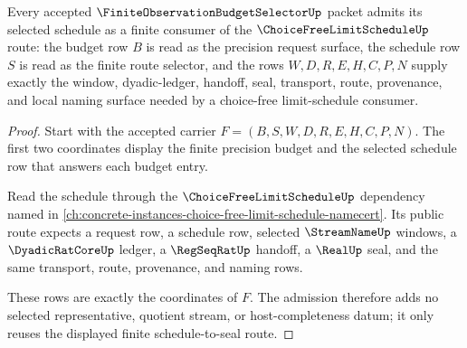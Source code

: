 \begin{theorem}
\label{thm:finite-observation-budget-selector-schedule-admission}
Every accepted $\FiniteObservationBudgetSelectorUp$ packet admits its selected schedule as a finite consumer of the $\ChoiceFreeLimitScheduleUp$ route: the budget row $B$ is read as the precision request surface, the schedule row $S$ is read as the finite route selector, and the rows $W,D,R,E,H,C,P,N$ supply exactly the window, dyadic-ledger, handoff, seal, transport, route, provenance, and local naming surface needed by a choice-free limit-schedule consumer.
\end{theorem}
\begin{proof}
Start with the accepted carrier $F=(B,S,W,D,R,E,H,C,P,N)$. The first two coordinates display the finite precision budget and the selected schedule row that answers each budget entry.

Read the schedule through the $\ChoiceFreeLimitScheduleUp$ dependency named in \autoref{ch:concrete-instances-choice-free-limit-schedule-namecert}. Its public route expects a request row, a schedule row, selected $\StreamNameUp$ windows, a $\DyadicRatCoreUp$ ledger, a $\RegSeqRatUp$ handoff, a $\RealUp$ seal, and the same transport, route, provenance, and naming rows.

These rows are exactly the coordinates of $F$. The admission therefore adds no selected representative, quotient stream, or host-completeness datum; it only reuses the displayed finite schedule-to-seal route.
\end{proof}

